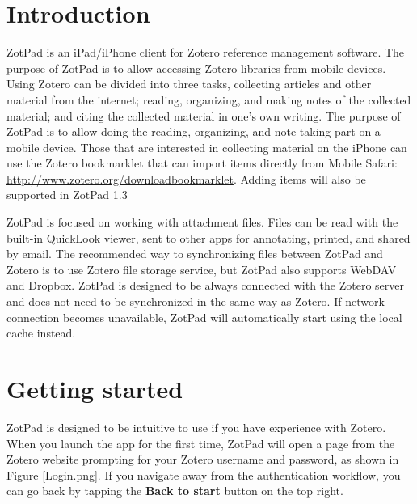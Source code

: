 \documentclass[oneside, openany, 12pt]{tufte-book}
\author{Version 1.2}
\newcommand{\iphone}[1]{#1}
\newcommand{\ipadfootnote}[1]{}
\newcommand{\iphone}[1]{}
\newcommand{\ipadfootnote}[1]{\footnote{#1}}
\begin{document}
\maketitle

\tableofcontents


\chapter{Introduction}




ZotPad is an iPad/iPhone client for Zotero reference management software. The purpose of ZotPad is to allow accessing Zotero libraries from mobile devices. Using Zotero can be divided into three tasks, collecting articles and other material from the internet; reading, organizing, and making notes of the collected material; and citing the collected material in one's own writing. The purpose of ZotPad is to allow doing the reading, organizing, and note taking part on a mobile device\ipadfootnote{Zotero provides a bookmarklet that can be used to import items directly from Mobile Safari: \url{http://www.zotero.org/downloadbookmarklet}. Adding items will also be supported in ZotPad 1.3}. \iphone{Those that are interested in collecting material on the iPhone can use the Zotero bookmarklet that can import items directly from Mobile Safari: \url{http://www.zotero.org/downloadbookmarklet}. Adding items will also be supported in ZotPad 1.3}

ZotPad is focused on working with attachment files. Files can be read with the built-in QuickLook viewer, sent to other apps for annotating, printed, and shared by email. The recommended way to synchronizing files between ZotPad and Zotero is to use Zotero file storage service, but ZotPad also supports WebDAV and Dropbox. ZotPad is designed to be always connected with the Zotero server and does not need to be synchronized in the same way as Zotero. If network connection becomes unavailable, ZotPad will automatically start using the local cache instead.

\chapter{Getting started}

ZotPad is designed to be intuitive to use if you have experience with Zotero. When you launch the app for the first time, ZotPad will open a page from the Zotero website prompting for your Zotero username and password, as shown in Figure \ref{Login.png}. If you navigate away from the authentication workflow, you can go back by tapping the \textbf{Back to start} button on the top right.
\end{document}

